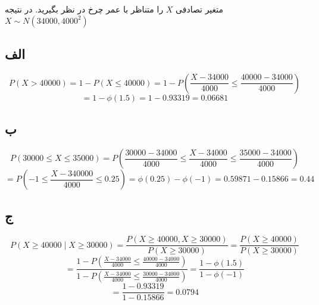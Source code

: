 
متغیر تصادفی $X$ را متناظر با عمر چرخ در نظر بگیرید. در نتیجه
$X \sim N(34000,4000^2)$

\subsection*{الف}
$$P(X > 40000) = 1 - P(X \leq 40000) = 1 - P(\frac{X - 34000}{4000} \leq \frac{40000 - 34000}{4000})$$
$$ = 1 - \phi(1.5) = 1 - 0.93319 = 0.06681$$
\subsection*{ب}
$$P(30000 \leq X \leq 35000) = P(\frac{30000 - 34000}{4000} \leq \frac{X - 34000}{4000} \leq \frac{35000 - 34000}{4000})$$
$$ = P(-1 \leq \frac{X - 340000}{4000} \leq 0.25) = \phi(0.25) - \phi(-1) = 0.59871 - 0.15866 = 0.44$$
\subsection*{ج}
$$P(X \geq 40000 \mid X \geq 30000) = \frac{P(X \geq 40000, X \geq 30000)}{P(X \geq 30000)} = \frac{P(X \geq 40000)}{P(X \geq 30000)}$$
$$= \frac{1 - P(\frac{X - 34000}{4000} \leq \frac{40000 - 34000}{4000})}{1 - P(\frac{X - 34000}{4000} \leq \frac{30000 - 34000}{4000})} = \frac{1 - \phi(1.5)}{1 - \phi(-1)}$$
$$ = \frac{1 - 0.93319}{1 - 0.15866} = 0.0794$$

